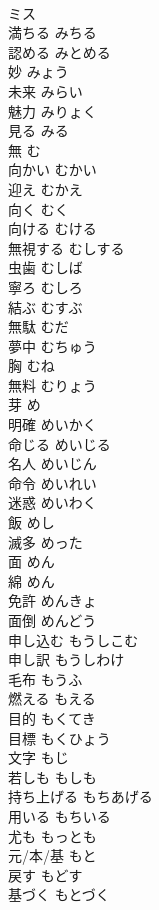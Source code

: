 \documentclass[8pt]{extreport}
\begin{document}
\begin{CJK}{UTF8}{min}
\\	ミス		
\\	満ちる	みちる	
\\	認める	みとめる	
\\	妙	みょう	
\\	未来	みらい	
\\	魅力	みりょく	
\\	見る	みる	
\\	無	む	
\\	向かい	むかい	
\\	迎え	むかえ	
\\	向く	むく	
\\	向ける	むける	
\\	無視する	むしする	
\\	虫歯	むしば	
\\	寧ろ	むしろ	
\\	結ぶ	むすぶ	
\\	無駄	むだ	
\\	夢中	むちゅう	
\\	胸	むね	
\\	無料	むりょう	
\\	芽	め	
\\	明確	めいかく	
\\	命じる	めいじる	
\\	名人	めいじん	
\\	命令	めいれい	
\\	迷惑	めいわく	
\\	飯	めし	
\\	滅多	めった	
\\	面	めん	
\\	綿	めん	
\\	免許	めんきょ	
\\	面倒	めんどう	
\\	申し込む	もうしこむ	
\\	申し訳	もうしわけ	
\\	毛布	もうふ	
\\	燃える	もえる	
\\	目的	もくてき	
\\	目標	もくひょう	
\\	文字	もじ	
\\	若しも	もしも	
\\	持ち上げる	もちあげる	
\\	用いる	もちいる	
\\	尤も	もっとも	
\\	元/本/基	もと	
\\	戻す	もどす	
\\	基づく	もとづく	

\end{CJK}
\end{document}

